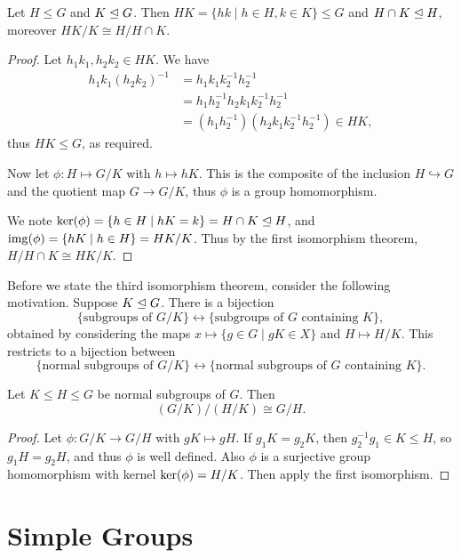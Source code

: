\documentclass[a4paper]{scrreprt}
\begin{document}
\begin{corollary}
	Let $H \leq G$ and $K \trianglelefteq G$. Then $HK = \{hk \mid h \in H, k \in K \} \leq G$ and $H \cap K \trianglelefteq H$, moreover $HK/K \cong H/H \cap K$.
\end{corollary}
\begin{proof}
	Let $h_1 k_1, h_2 k_2 \in HK$. We have
	\begin{align*}
		h_1 k_1 (h_2 k_2)^{-1} &= h_1 k_1 k_2^{-1} h_2^{-1} \\&= h_1 h_2^{-1} h_2 k_1 k_2^{-1} h_2^{-1} \\&= (h_1 h_2^{-1}) (h_2 k_1 k_2^{-1} h_2^{-1}) \in HK,
	\end{align*}
	thus $HK \leq G$, as required.

	Now let $\phi:H \mapsto G/K$ with $h \mapsto hK$. This is the composite of the inclusion $H \hookrightarrow G$ and the quotient map $G \rightarrow G/K$, thus $\phi$ is a group homomorphism.

	We note $\operatorname{ker}(\phi) = \{h \in H \mid hK = k\} = H \cap K \trianglelefteq H$, and $\operatorname{img}(\phi) =\{hK \mid h \in H \} = HK / K$. Thus by the first isomorphism theorem,
	$
	H/H \cap K \cong HK/K.
	$
\end{proof}

Before we state the third isomorphism theorem, consider the following motivation. Suppose $K \trianglelefteq G$. There is a bijection
$$
\{\text{subgroups of } G/K \} \longleftrightarrow \{ \text{subgroups of } G \text{ containing }K \},
$$
obtained by considering the maps $x \mapsto \{g \in G \mid gK \in X \}$ and $H \mapsto H/K$. This restricts to a bijection between 
$$
\{\text{normal subgroups of }G/K \} \longleftrightarrow \{\text{normal subgroups of }G\text{ containing }K\}.
$$

\begin{corollary}
	Let $K \leq H \leq G$ be normal subgroups of $G$. Then
	$$
	(G/K) / (H/K) \cong G/H.
	$$
\end{corollary}
\begin{proof}
	Let $\phi: G/K \rightarrow G/H$ with $gK \mapsto gH$. If $g_1K = g_2 K$, then $g_2^{-1}g_1 \in K \leq H$, so $g_1 H = g_2 H$, and thus $\phi$ is well defined. Also $\phi$ is a surjective group homomorphism with kernel $\operatorname{ker}(\phi) = H/K$. Then apply the first isomorphism.
\end{proof}

\section{Simple Groups}
\end{document}
